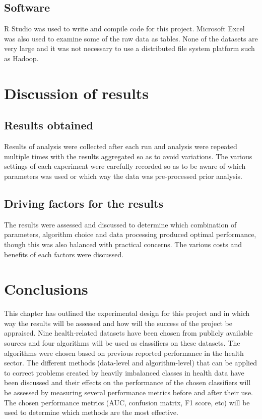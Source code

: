 \subsection{Software}

R Studio was used to write and compile code for this project. Microsoft Excel was also used to examine some of the raw data as tables. 
None of the datasets are very large and it was not necessary to use a distributed file system platform such as Hadoop.

\section{Discussion of results}
\subsection{Results obtained}
Results of analysis were collected after each run and analysis were repeated multiple times with the results aggregated so as to avoid variations.
The various settings of each experiment were carefully recorded so as to be aware of which parameters was used or which way the data was pre-processed prior analysis.

\subsection{Driving factors for the results}
The results were assessed and discussed to determine which combination of parameters, algorithm choice and data processing produced optimal performance, though this was also balanced with practical concerns. The various costs and benefits of each factors were discussed.


\section{Conclusions}

This chapter has outlined the experimental design for this project and in which way the results will be assessed and how will the success of the project be appraised. 
Nine health-related datasets have been chosen from publicly available sources and four algorithms will be used as classifiers on these datasets. The algorithms were chosen based on previous reported performance in the health sector. The different methods (data-level and algorithm-level) that can be applied to correct problems created by heavily imbalanced classes in health data have been discussed and their effects on the performance of the chosen classifiers will be assessed by measuring several performance metrics before and after their use.
The chosen performance metrics (AUC, confusion matrix, F1 score, etc) will be used to determine which methods are the most effective.





